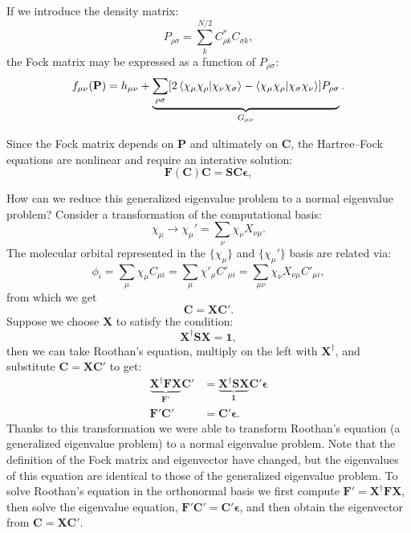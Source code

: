 \documentclass[../Main/chem532-notes.tex]{subfiles}
\begin{document}
If we introduce the density matrix:
\begin{equation}
P_{\rho\sigma} = \sum_k^{N/2} C_{\rho k}^* C_{\sigma k},
\end{equation}
the Fock matrix may be expressed as a function of $P_{\rho\sigma}$:
\begin{equation}
f_{\mu\nu}(\mathbf{P}) = h_{\mu\nu}
+\underbrace{
\sum_{\rho\sigma} [ 2 \braket{\chi_\mu \chi_\rho|\chi_\nu \chi_\sigma} 
- \braket{\chi_\mu \chi_\rho|\chi_\sigma \chi_\nu }] P_{\rho\sigma}
}_{G_{\mu\nu}}.
\end{equation}

Since the Fock matrix depends on $\mathbf{P}$ and ultimately on $\mathbf{C}$, the Hartree--Fock equations are nonlinear and require an interative solution:
\begin{equation}
 \mathbf{F}(\mathbf{C})\mathbf{C} = \mathbf{S}\mathbf{C}\boldsymbol{\epsilon},
\end{equation}

How can we reduce this generalized eigenvalue problem to a normal eigenvalue problem?
Consider a transformation of the computational basis:
\begin{equation}
\chi_\mu \rightarrow \chi_\mu' = \sum_\nu \chi_\nu X_{\nu\mu}.
\end{equation}
The molecular orbital represented in the $\{\chi_\mu\}$ and $\{\chi_\mu'\}$ basis are related via:
\begin{equation}
\phi_i = \sum_\mu \chi_\mu C_{\mu i} = \sum_\mu \chi'_\mu C'_{\mu i} = \sum_{\mu \nu} \chi_\nu X_{\nu\mu}  C'_{\mu i},
\end{equation}
from which we get
\begin{equation}
\mathbf{C} = \mathbf{XC}'.
\end{equation}
Suppose we choose $\mathbf{X}$ to satisfy the condition:
\begin{equation}
\mathbf{X}^\dagger \mathbf{SX} = \mathbf{1},
\end{equation}
then we can take Roothan's equation, multiply on the left with $\mathbf{X}^\dagger$, and substitute $\mathbf{C} = \mathbf{XC}'$ to get:
\begin{equation}
\begin{split}
\underbrace{\mathbf{X}^\dagger\mathbf{F}\mathbf{X}}_{\mathbf{F}'}\mathbf{C}' &= \underbrace{\mathbf{X}^\dagger\mathbf{S}\mathbf{X}}_{\mathbf{1}}\mathbf{C}'\boldsymbol{\epsilon} \\
\mathbf{F}'\mathbf{C}' &= \mathbf{C}'\boldsymbol{\epsilon}.
\end{split}
\end{equation}
Thanks to this transformation we were able to transform Roothan's equation (a generalized eigenvalue problem) to a normal eigenvalue problem.
Note that the definition of the Fock matrix and eigenvector have changed, but the eigenvalues of this equation are identical to those of the generalized eigenvalue problem.
To solve Roothan's equation in the orthonormal basis we first compute $\mathbf{F}' =\mathbf{X}^\dagger\mathbf{F}\mathbf{X}$, then solve the  eigenvalue equation, $\mathbf{F}'\mathbf{C}' = \mathbf{C}'\boldsymbol{\epsilon}$, and then obtain the eigenvector from $\mathbf{C} = \mathbf{XC}'$.
\end{document}

